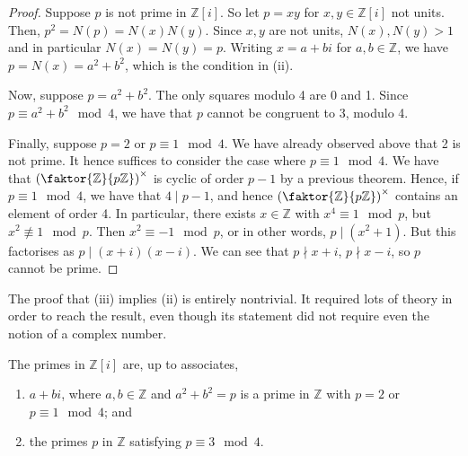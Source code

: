 \begin{proof}
	Suppose \( p \) is not prime in \( \mathbb Z[i] \).
	So let \( p = xy \) for \( x, y \in \mathbb Z[i] \) not units.
	Then, \( p^2 = N(p) = N(x)N(y) \).
	Since \( x, y \) are not units, \( N(x), N(y) > 1 \) and in particular \( N(x) = N(y) = p \).
	Writing \( x = a+bi \) for \( a, b \in \mathbb Z \), we have \( p = N(x) = a^2 + b^2 \), which is the condition in (ii).

	Now, suppose \( p = a^2 + b^2 \).
	The only squares modulo 4 are 0 and 1.
	Since \( p \equiv a^2 + b^2 \mod 4 \), we have that \( p \) cannot be congruent to 3, modulo 4.

	Finally, suppose \( p = 2 \) or \( p \equiv 1 \mod 4 \).
	We have already observed above that 2 is not prime.
	It hence suffices to consider the case where \( p \equiv 1 \mod 4 \).
	We have that \( \qty(\faktor{\mathbb Z}{p\mathbb Z})^\times \) is cyclic of order \( p-1 \) by a previous theorem.
	Hence, if \( p \equiv 1 \mod 4 \), we have that \( 4 \mid p-1 \), and hence \( \qty(\faktor{\mathbb Z}{p\mathbb Z})^\times \) contains an element of order 4.
	In particular, there exists \( x \in \mathbb Z \) with \( x^4 \equiv 1 \mod p \), but \( x^2 \not\equiv 1 \mod p \).
	Then \( x^2 \equiv -1 \mod p \), or in other words, \( p \mid (x^2 + 1) \).
	But this factorises as \( p \mid (x+i)(x-i) \).
	We can see that \( p \nmid x+i \), \( p \nmid x-i \), so \( p \) cannot be prime.
\end{proof}
\begin{remark}
	The proof that (iii) implies (ii) is entirely nontrivial.
	It required lots of theory in order to reach the result, even though its statement did not require even the notion of a complex number.
\end{remark}
\begin{theorem}
	The primes in \( \mathbb Z[i] \) are, up to associates,
	\begin{enumerate}
		\item \( a + bi \), where \( a, b \in \mathbb Z \) and \( a^2 + b^2 = p \) is a prime in \( \mathbb Z \) with \( p = 2 \) or \( p \equiv 1 \mod 4 \); and
		\item the primes \( p \) in \( \mathbb Z \) satisfying \( p \equiv 3 \mod 4 \).
	\end{enumerate}
\end{theorem}
